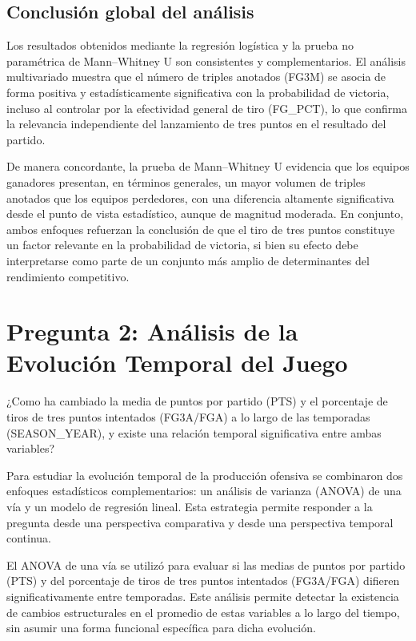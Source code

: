 \documentclass[12pt]{article}
\begin{document}
\subsection*{Conclusión global del análisis}

Los resultados obtenidos mediante la regresión logística y la prueba no paramétrica de
Mann--Whitney U son consistentes y complementarios. El análisis multivariado muestra que el
número de triples anotados (FG3M) se asocia de forma positiva y estadísticamente significativa
con la probabilidad de victoria, incluso al controlar por la efectividad general de tiro
(FG\_PCT), lo que confirma la relevancia independiente del lanzamiento de tres puntos en el
resultado del partido.

De manera concordante, la prueba de Mann--Whitney U evidencia que los equipos ganadores
presentan, en términos generales, un mayor volumen de triples anotados que los equipos
perdedores, con una diferencia altamente significativa desde el punto de vista estadístico,
aunque de magnitud moderada. En conjunto, ambos enfoques refuerzan la conclusión de que el tiro
de tres puntos constituye un factor relevante en la probabilidad de victoria, si bien su
efecto debe interpretarse como parte de un conjunto más amplio de determinantes del
rendimiento competitivo.



\section{Pregunta 2: Análisis de la Evolución Temporal del Juego}
\label{subsec:pregunta2-analisis}

\vspace{0.3cm}

¿Como ha cambiado la media de puntos por partido (PTS) y el porcentaje de tiros de tres puntos intentados (FG3A/FGA) a lo largo de las temporadas (SEASON\_YEAR), y existe una relación temporal significativa entre ambas variables?

\vspace{0.3cm}

Para estudiar la evolución temporal de la producción ofensiva se combinaron dos enfoques
estadísticos complementarios: un análisis de varianza (ANOVA) de una vía y un modelo de
regresión lineal. Esta estrategia permite responder a la pregunta desde una perspectiva
comparativa y desde una perspectiva temporal continua.

El ANOVA de una vía se utilizó para evaluar si las medias de puntos por partido (PTS) y del
porcentaje de tiros de tres puntos intentados (FG3A/FGA) difieren significativamente entre
temporadas. Este análisis permite detectar la existencia de cambios estructurales en el
promedio de estas variables a lo largo del tiempo, sin asumir una forma funcional específica
para dicha evolución.
\end{document}
